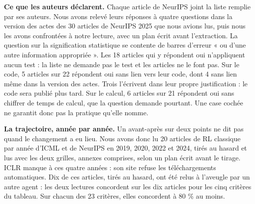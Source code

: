 \documentclass[11pt,a4paper]{article}
\begin{document}
\textbf{Ce que les auteurs déclarent.} Chaque article de NeurIPS joint
la liste remplie par ses auteurs. Nous avons relevé leurs réponses à
quatre questions dans la version des actes des 30 articles de NeurIPS
2025 que nous avions lus, puis nous les avons confrontées à notre
lecture, avec un plan écrit avant l'extraction. La question sur la
signification statistique se contente de barres d'erreur « ou d'une
autre information appropriée ». Les 18 articles qui y répondent oui
n'appliquent aucun test : la liste ne demande pas le test et les
articles ne le font pas. Sur le code, 5 articles sur 22 répondent oui
sans lien vers leur code, dont 4 sans lien même dans la version des
actes. Trois l'écrivent dans leur propre justification : le code sera
publié plus tard. Sur le calcul, 6 articles sur 21 répondent oui sans
chiffrer de temps de calcul, que la question demande pourtant. Une case
cochée ne garantit donc pas la pratique qu'elle nomme.

\textbf{La trajectoire, année par année.} Un avant-après sur deux points
ne dit pas quand le changement a eu lieu. Nous avons donc lu 20 articles
de RL classique par année d'ICML et de NeurIPS en 2019, 2020, 2022 et
2024, tirés au hasard et lus avec les deux grilles, annexes comprises,
selon un plan écrit avant le tirage. ICLR manque à ces quatre années :
son site refuse les téléchargements automatiques. Dix de ces articles,
tirés au hasard, ont été relus à l'aveugle par un autre agent : les deux
lectures concordent sur les dix articles pour les cinq critères du
tableau. Sur chacun des 23 critères, elles concordent à 80 \% au moins.
\end{document}
